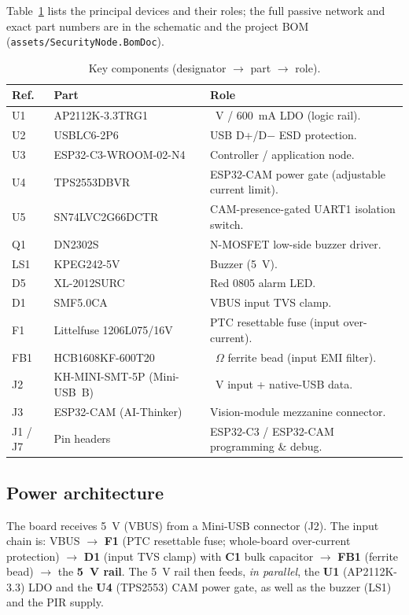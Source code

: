 \documentclass[11pt,a4paper]{article}
\begin{document}
Table~\ref{tab:bom} lists the principal devices and their roles; the full
passive network and exact part numbers are in the schematic and the project BOM
(\texttt{assets/SecurityNode.BomDoc}).

\begin{table}[H]
    \centering
    \caption{Key components (designator $\rightarrow$ part $\rightarrow$ role).}
    \label{tab:bom}
    \begin{tabular}{@{}l >{\raggedright\arraybackslash}p{4.4cm} >{\raggedright\arraybackslash}p{6.2cm}@{}}
        \toprule
        \textbf{Ref.} & \textbf{Part} & \textbf{Role} \\
        \midrule
        U1 & AP2112K-3.3TRG1 & 3.3~V / 600~mA LDO (logic rail). \\
        U2 & USBLC6-2P6 & USB D+/D$-$ ESD protection. \\
        U3 & ESP32-C3-WROOM-02-N4 & Controller / application node. \\
        U4 & TPS2553DBVR & ESP32-CAM power gate (adjustable current limit). \\
        U5 & SN74LVC2G66DCTR & CAM-presence-gated UART1 isolation switch. \\
        Q1 & DN2302S & N-MOSFET low-side buzzer driver. \\
        LS1 & KPEG242-5V & Buzzer (5~V). \\
        D5 & XL-2012SURC & Red 0805 alarm LED. \\
        D1 & SMF5.0CA & VBUS input TVS clamp. \\
        F1 & Littelfuse 1206L075/16V & PTC resettable fuse (input over-current). \\
        FB1 & HCB1608KF-600T20 & 60~$\Omega$ ferrite bead (input EMI filter). \\
        J2 & KH-MINI-SMT-5P (Mini-USB~B) & 5~V input + native-USB data. \\
        J3 & ESP32-CAM (AI-Thinker) & Vision-module mezzanine connector. \\
        J1 / J7 & Pin headers & ESP32-C3 / ESP32-CAM programming \& debug. \\
        \bottomrule
    \end{tabular}
\end{table}

\subsection{Power architecture}

The board receives 5~V (VBUS) from a Mini-USB connector (J2).  The input chain
is: VBUS $\rightarrow$ \textbf{F1} (PTC resettable fuse; whole-board over-current
protection) $\rightarrow$ \textbf{D1} (input TVS clamp) with \textbf{C1} bulk
capacitor $\rightarrow$ \textbf{FB1} (ferrite bead) $\rightarrow$ the
\textbf{5~V rail}.  The 5~V rail then feeds, \emph{in parallel}, the
\textbf{U1} (AP2112K-3.3) LDO and the \textbf{U4} (TPS2553) CAM power gate, as
well as the buzzer (LS1) and the PIR supply.
\end{document}

